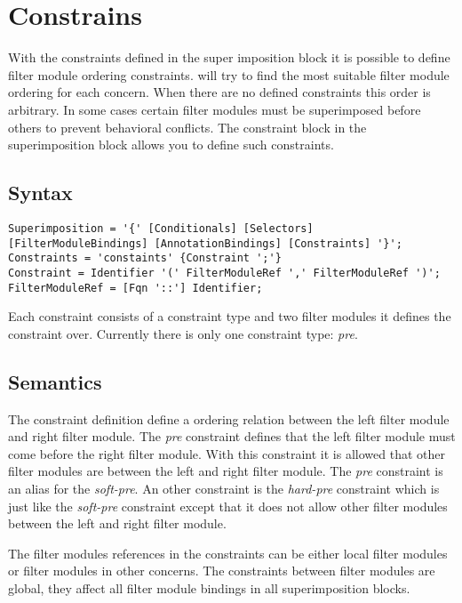 \chapter{Constrains}\label{cha::fmconstaints}

With the constraints defined in the super imposition block it is possible to define filter module ordering constraints.
\Compose* will try to find the most suitable filter module ordering for each concern.
When there are no defined constraints this order is arbitrary.
In some cases certain filter modules must be superimposed before others to prevent behavioral conflicts.
The constraint block in the superimposition block allows you to define such constraints.

\section{Syntax}

\begin{lstlisting}[caption={Filter Module Constrains Grammar}, label=lst::ARM:fmconstraint:syntax, style=listing, language=ebnf, float=tpb]
Superimposition = '{' [Conditionals] [Selectors] [FilterModuleBindings] [AnnotationBindings] [Constraints] '}';
Constraints = 'constaints' {Constraint ';'}
Constraint = Identifier '(' FilterModuleRef ',' FilterModuleRef ')';
FilterModuleRef = [Fqn '::'] Identifier;
\end{lstlisting}

Each constraint consists of a constraint type and two filter modules it defines the constraint over.
Currently there is only one constraint type: \emph{pre}.

\section{Semantics}

The constraint definition define a ordering relation between the left filter module and right filter module.
The \emph{pre} constraint defines that the left filter module must come before the right filter module.
With this constraint it is allowed that other filter modules are between the left and right filter module.
The \emph{pre} constraint is an alias for the \emph{soft-pre}.
An other constraint is the \emph{hard-pre} constraint which is just like the \emph{soft-pre} constraint except that it does not allow other filter modules between the left and right filter module.

The filter modules references in the constraints can be either local filter modules or filter modules in other concerns.
The constraints between filter modules are global, they affect all filter module bindings in all superimposition blocks.

